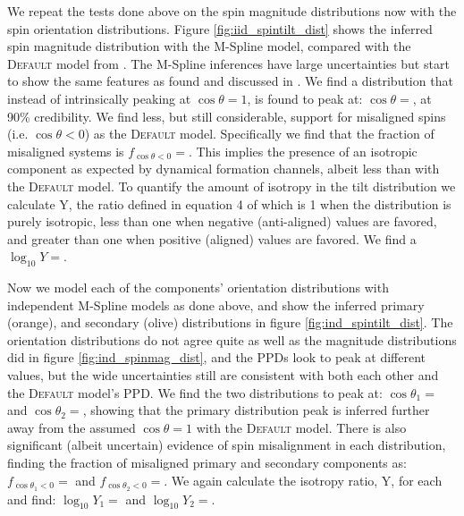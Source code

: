 We repeat the tests done above on the spin magnitude distributions now with the spin orientation distributions. Figure \ref{fig:iid_spintilt_dist} 
shows the inferred spin magnitude distribution with the M-Spline model, compared with the \textsc{Default} model from \citet{o3b_astro_dist}. 
The M-Spline inferences have large uncertainties but start to show the same features as found and discussed in \citet{spinitasyoulike}. 
We find a distribution that instead of intrinsically peaking at $\cos{\theta}=1$, is found to peak at: $\cos{\theta}=$\result{$\CIPlusMinus{\macros[MSplineIIDCompSpins][peakCosTilt]}$}, at 
90\% credibility. We find less, but still considerable, support for misaligned spins (i.e. $\cos{\theta}<0$) as the \textsc{Default} model. Specifically we 
find that the fraction of misaligned systems is $f_{\cos{\theta}<0}=$\result{$\CIPlusMinus{\macros[MSplineIIDCompSpins][negFrac]}$}. This implies 
the presence of an isotropic component as expected by dynamical formation channels, albeit less than with the \textsc{Default} model. To quantify the 
amount of isotropy in the tilt distribution we calculate Y, the ratio defined in equation 4 of \citet{spinitasyoulike} which is 1 when the distribution is 
purely isotropic, less than one when negative (anti-aligned) values are favored, and greater than one when positive (aligned) values are favored.
We find a $\log_{10}Y=$. 

Now we model each of the components' orientation distributions with independent M-Spline models as done above, and show the inferred 
primary (orange), and secondary (olive) distributions in figure \ref{fig:ind_spintilt_dist}. The orientation distributions do not agree quite as well as 
the magnitude distributions did in figure \ref{fig:ind_spinmag_dist}, and the PPDs look to peak at different values, but the wide uncertainties still are 
consistent with both each other and the \textsc{Default} model's PPD. We find the two distributions to peak at: $\cos{\theta_1}=$\result{$\CIPlusMinus{\macros[MSplineIndependentCompSpins][peakCosTilt1]}$} 
and $\cos{\theta_2}=$\result{$\CIPlusMinus{\macros[MSplineIndependentCompSpins][peakCosTilt2]}$}, showing that the primary distribution peak is inferred further away 
from the assumed $\cos{\theta}=1$ with the \textsc{Default} model. There is also significant (albeit uncertain) evidence of spin misalignment in each distribution, finding 
the fraction of misaligned primary and secondary components as: $f_{\cos{\theta_1}<0}=$\result{$\CIPlusMinus{\macros[MSplineIndependentCompSpins][negFrac1]}$} and 
$f_{\cos{\theta_2}<0}=$\result{$\CIPlusMinus{\macros[MSplineIndependentCompSpins][negFrac2]}$}. We again calculate the isotropy ratio, Y, 
for each and find: $\log_{10}Y_1=$ and 
$\log_{10}Y_2=$.

